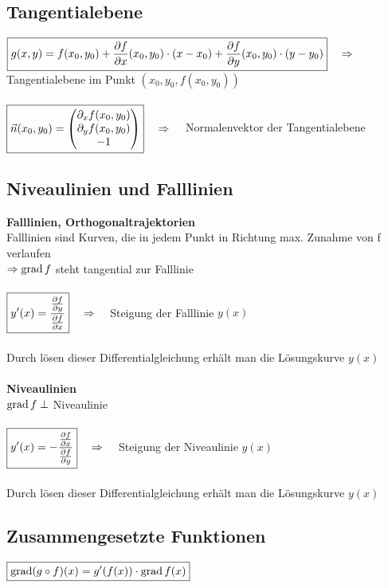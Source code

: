 \subsection{Tangentialebene}
$\boxed{g(x,y)=f(x_0,y_0)+\dfrac{\partial f}{\partial x}(x_0,y_0)\cdot(x-x_0)+\dfrac{\partial f}{\partial y}(x_0,y_0)\cdot(y-y_0)}
\quad \Rightarrow \quad$ Tangentialebene im Punkt $(x_0,y_0,f(x_0,y_0))$\\ \\
$\boxed{\vec{n}(x_0,y_0)=
\begin{pmatrix}
	\partial_{x} f(x_0,y_0)\\
	\partial_{y} f(x_0,y_0)\\
	-1\\                         
\end{pmatrix}} \quad \Rightarrow \quad$ Normalenvektor der Tangentialebene

\subsection{Niveaulinien und Falllinien}
\textbf{Falllinien, Orthogonaltrajektorien}\\
Falllinien sind Kurven, die in jedem Punkt in Richtung max. Zunahme von f
verlaufen\\
$\Rightarrow \operatorname{grad} f$ steht tangential zur Falllinie\\\\
$\boxed{y'(x)= \dfrac{\frac{\partial f}{\partial y}}{\frac{\partial f}{\partial x}}} \quad
\Rightarrow \quad$ Steigung der Falllinie $y(x)$\\\\
Durch lösen dieser Differentialgleichung erhält man
die Lösungskurve $y(x)$\\ \\
\textbf{Niveaulinien}\\
$\operatorname{grad} f \perp $ Niveaulinie\\\\
$\boxed{y'(x)=- \dfrac{\frac{\partial f}{\partial x}}{\frac{\partial f}{\partial y}}}\quad
\Rightarrow \quad$ Steigung der Niveaulinie $y(x)$\\\\
Durch lösen dieser Differentialgleichung erhält man
die Lösungskurve $y(x)$

\subsection{Zusammengesetzte Funktionen}
$\boxed{\operatorname{grad}(g\circ f)(x)=g'(f(x))\cdot \operatorname{grad} f(x)}$
\newpage

